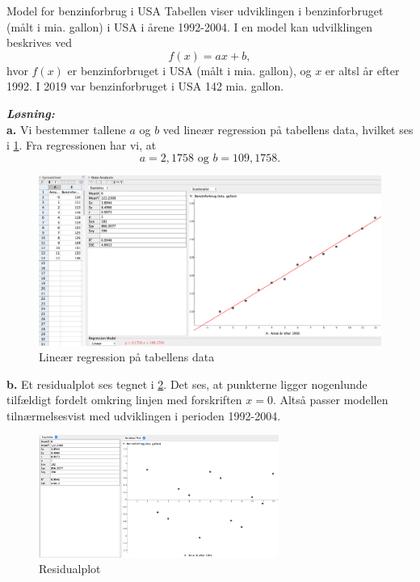 \documentclass{article}
\newcommand{\sol}{\setlength{\parindent}{0cm}\textbf{\textit{Løsning:}}\setlength{\parindent}{1cm}}
\begin{document}
\begin{question}{Model for benzinforbrug i USA}{}
  Tabellen viser udviklingen i benzinforbruget (målt i mia. gallon) i USA i årene 1992-2004.
  I en model kan udvilklingen beskrives ved
  \[
  f(x)= ax + b,
  \] 
  hvor $f(x)$ er benzinforbruget i USA (målt i mia. gallon), og $x$ er altsl år efter 1992. 
  I 2019 var benzinforbruget i USA 142 mia. gallon.
\end{question}
\sol \\
\textbf{a.}
Vi bestemmer tallene $a$ og $b$ ved lineær regression på tabellens data, hvilket ses i \cref{fig:gallon}. 
Fra regressionen har vi, at
\[
a=2,1758 \text{ og } b=109,1758.
\] 
\begin{figure}[H]
\begin{center}
  \includegraphics[width=\textwidth]{gallon.png}
\end{center}
\caption{Lineær regression på tabellens data}
\label{fig:gallon}
\end{figure}

\noindent \textbf{b.}
Et residualplot ses tegnet i \cref{fig:gallonresidual}.
Det ses, at punkterne ligger nogenlunde tilfældigt fordelt omkring linjen med forskriften $x=0$.
Altså passer modellen tilnærmelsesvist med udviklingen i perioden 1992-2004.
\begin{figure}[H]
\begin{center}
  \includegraphics[width=0.7\textwidth]{gallonresidual.png}
\end{center}
\caption{Residualplot}
\label{fig:gallonresidual}
\end{figure}
\end{document}
